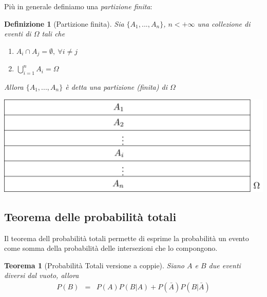\documentclass[
  11pt,
]{book}
\providecommand{\tightlist}{%
  \setlength{\itemsep}{0pt}\setlength{\parskip}{0pt}}
\theoremstyle{mytheoremstyle}
\newtheorem{theorem}{Teorema}[section]
\theoremstyle{mydefstyle}
\newtheorem{definition}{Definizione}[section]
\begin{document}
Più in generale definiamo una \emph{partizione finita}:

\begin{definition}[Partizione finita]
Sia \(\{A_1,...,A_n\}\), \(n<+\infty\) una collezione di eventi di \(\Omega\)
tali che

\begin{enumerate}
\def\labelenumi{\arabic{enumi}.}
\tightlist
\item
  \(A_i\cap A_j=\emptyset, ~\forall i\ne j\)
\item
  \(\bigcup_{i=1}^n A_i=\Omega\)
\end{enumerate}

Allora \(\{A_1,...,A_n\}\) è detta una \emph{partizione} (finita) di \(\Omega\)
\end{definition}

\begin{center}\includegraphics[width=41.67in,height=0.2\textheight,]{img/npart} \end{center}

\subsection{Teorema delle probabilità totali}\label{teorema-delle-probabilituxe0-totali}

Il teorema dell probabilità totali permette di esprime la probabilità un
evento come somma della probabilità delle intersezioni che lo
compongono.

\begin{info}

\begin{theorem}[Probabilità Totali versione a coppie]
Siano \(A\) e \(B\) due eventi diversi dal vuoto, allora \begin{eqnarray*}
P(B)&=&P(A)P(B|A)+P(\bar A)P(B|\bar A)
\end{eqnarray*}
\end{theorem}

\end{info}
\end{document}
